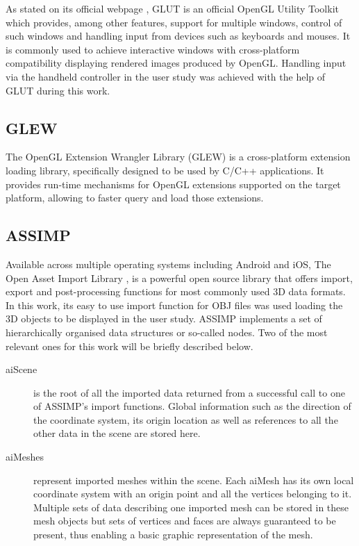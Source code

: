 As stated on its official webpage \cite{GLUT}, GLUT is an official OpenGL Utility Toolkit which provides, among other features, support for multiple windows, control of such windows and handling input from devices such as keyboards and mouses. It is commonly used to achieve interactive windows with cross-platform compatibility displaying rendered images produced by OpenGL. Handling input via the handheld controller in the user study was achieved with the help of GLUT during this work.

\subsection{GLEW}
\label{sec:glew}

The OpenGL Extension Wrangler Library (GLEW)\cite{GLEW} is a cross-platform extension loading library, specifically designed to be used by C/C++ applications. It provides run-time mechanisms for OpenGL extensions supported on the target platform, allowing to faster query and load those extensions.

\subsection{ASSIMP}
\label{sec:assimp}

Available across multiple operating systems including Android and iOS, The Open Asset Import Library \cite{ASP}, is a powerful open source library that offers import, export and post-processing functions for most commonly used 3D data formats. In this work, its easy to use import function for OBJ files was used loading the 3D objects to be displayed in the user study. ASSIMP implements a set of hierarchically organised data structures or so-called nodes. Two of the most relevant ones for this work will be briefly described below.

\begin{description}
	\item[aiScene] is the root of all the imported data returned from a successful call to one of ASSIMP's import functions. Global information such as the direction of the coordinate system, its origin location as well as references to all the other data in the scene are stored here.
	\item[aiMeshes] represent imported meshes within the scene. Each aiMesh has its own local coordinate system with an origin point and all the vertices belonging to it. Multiple sets of data describing one imported mesh can be stored in these mesh objects but sets of vertices and faces are always guaranteed to be present, thus enabling a basic graphic representation of the mesh.
\end{description}

